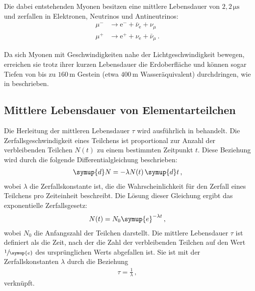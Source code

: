 Die dabei entstehenden Myonen besitzen eine mittlere Lebensdauer von $2,2\,\unit{\micro\second}$ \cite{PDG2024} und zerfallen in Elektronen, Neutrinos und Antineutrinos:
\begin{align*}
	\mu^- &\rightarrow \text{e}^- + \bar{\nu}_\text{e} + \nu_\mu \\
	\mu^+ &\rightarrow \text{e}^+ + \nu_\text{e} + \bar{\nu}_\mu\,.
\end{align*}

Da sich Myonen mit Geschwindigkeiten nahe der Lichtgeschwindigkeit bewegen, erreichen sie trotz ihrer kurzen Lebensdauer die Erdoberfläche und können sogar Tiefen von bis zu $160\,\unit{\meter}$ Gestein (etwa $400\,\unit{\meter}$ Wasseräquivalent) durchdringen, wie in \cite{Astroteilchenphysik} beschrieben.

\subsection{Mittlere Lebensdauer von Elementarteilchen}
Die Herleitung der mittleren Lebensdauer $\tau$ wird ausführlich in \cite{Techniques} behandelt. Die Zerfallsgeschwindigkeit eines Teilchens 
ist proportional zur Anzahl der verbleibenden Teilchen $N(t)$ zu einem bestimmten Zeitpunkt $t$. Diese Beziehung wird durch die folgende 
Differentialgleichung beschrieben:
\begin{align}
\symup{d}N = -\lambda N(t)\,\symup{d}t \,, %
\end{align}
wobei $\lambda$ die Zerfallskonstante ist, die die Wahrscheinlichkeit für den Zerfall eines Teilchens pro Zeiteinheit beschreibt. 
Die Lösung dieser Gleichung ergibt das exponentielle Zerfallsgesetz:
\begin{align}
N(t) = N_0 \symup{e}^{-\lambda t} \,, \label{eqn:Zerfallsgesetz}
\end{align}
wobei $N_0$ die Anfangszahl der Teilchen darstellt. Die mittlere Lebensdauer $\tau$ ist definiert als die Zeit, nach der die Zahl der 
verbleibenden Teilchen auf den Wert $\sfrac{1}{\symup{e}}$ des ursprünglichen Werts abgefallen ist. Sie ist mit der Zerfallskonstanten $\lambda$ durch die Beziehung
\begin{align}
\tau = \frac{1}{\lambda}\,, \label{eqn:tau}
\end{align}
verknüpft.



%
%


